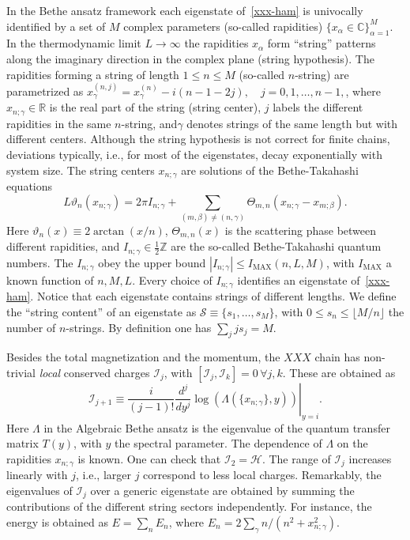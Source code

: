 \documentclass[twocolumn,superscriptaddress,prb,10pt]{revtex4-1}
\begin{document}
In the Bethe ansatz framework each eigenstate of~\eqref{xxx-ham} is univocally 
identified by a set of $M$ complex parameters (so-called rapidities) 
$\{x_\alpha\in\mathbb{C}\}_{\alpha=1}^M$. In the thermodynamic limit 
$L\to\infty$ the rapidities ${x_\alpha}$ form ``string'' patterns along 
the imaginary direction in the complex plane (string hypothesis). The 
rapidities forming a string of length $1\le n\le M$ (so-called $n$-string) 
are parametrized as $x_\gamma^{(n,j)}=x_\gamma^{(n)}-i(n-1-2j),\quad j=0,1,
\dots,n-1,$, where $x_{n;\gamma}\in\mathbb{R}$ is the real part of the 
string (string center), $j$ labels the different rapidities in the same 
$n$-string, and$\gamma$ denotes strings of the same length but with 
different centers. Although the string hypothesis is not correct for finite 
chains, deviations typically, i.e., for most of the eigenstates, decay 
exponentially with system size. The string centers $x_{n;\gamma}$ are 
solutions of the Bethe-Takahashi equations 
%
\begin{equation}
L\vartheta_n(x_{n;\gamma})=2\pi I_{n;\gamma}+\sum\limits_{(m,\beta)
\ne(n,\gamma)}\Theta_{m,n}(x_{n;\gamma}-x_{m;\beta}).
\label{bt-eq}
\end{equation}
%
Here $\vartheta_n(x)\equiv2\arctan(x/n)$, $\Theta_{m,n}(x)$ is the scattering 
phase between different rapidities, and $I_{n;\gamma}\in\frac{1}{2}
\mathbb{Z}$ are the so-called Bethe-Takahashi quantum numbers. 
The $I_{n;\gamma}$ obey the upper bound $|I_{n;\gamma}|\le I_{\textrm{MAX}}(n,L,M)$, 
with $I_{\textrm{MAX}}$ a known function of $n,M,L$. 
Every choice of $I_{n;\gamma}$ identifies an eigenstate of~\eqref{xxx-ham}. 
Notice that each eigenstate contains strings of different lengths. We define 
the ``string content'' of an eigenstate as ${\mathcal S}\equiv\{s_1,\dots,
s_M\}$, with $0\le s_n\le \lfloor M/n\rfloor$ the number of $n$-strings. By 
definition one has $\sum_{j}js_j=M$. 


Besides the total magnetization and the momentum, the $XXX$ chain has non-trivial 
{\it local} conserved charges ${\mathcal I}_j$, with $[{\mathcal I}_j,
{\mathcal I}_k]=0\,\forall j,k$. These are obtained as  
%
\begin{equation}
\label{I-def}
\left.{\mathcal I}_{j+1}\equiv\frac{i}{(j-1)!}\frac{d^j}{dy^j}\log(\Lambda
(\{x_{n;\gamma}\},y))
\right|_{y=i}.
\end{equation}
%
Here $\Lambda$ in the Algebraic Bethe ansatz is the eigenvalue of the quantum 
transfer matrix $T(y)$, with $y$ the spectral parameter. The dependence of 
$\Lambda$ on the rapidities $x_{n;\gamma}$ is known. One can check that 
${\mathcal I}_2={\mathcal H}$. The range of ${\mathcal I}_j$ increases 
linearly with $j$, i.e., larger $j$ correspond to less local charges. 
Remarkably, the eigenvalues of ${\mathcal I}_j$ over a generic eigenstate are 
obtained by summing the contributions of the different string sectors independently. 
For instance, the energy is obtained as $E=\sum_n E_n$, where $E_n=2\sum_\gamma n/
(n^2+x^2_{n;\gamma})$. 
\end{document}
